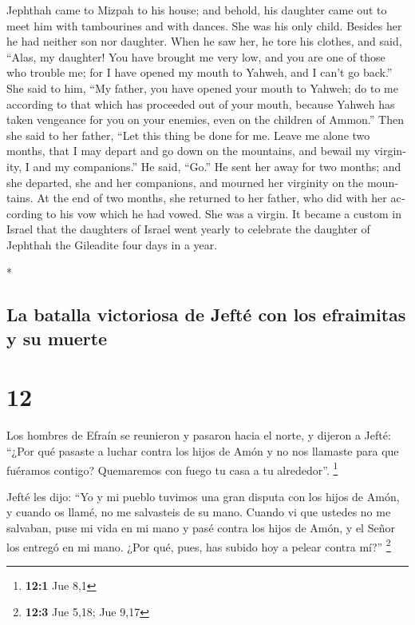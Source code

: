\begin{paracol}{2}
\begin{otherlanguage}{english}
 Jephthah came to Mizpah to his house; and behold, his
daughter came out to meet him with tambourines and with dances. She was
his only child. Besides her he had neither son nor daughter.
 When he saw her, he tore his clothes, and said, ``Alas,
my daughter! You have brought me very low, and you are one of those who
trouble me; for I have opened my mouth to Yahweh, and I can't go back.''
 She said to him, ``My father, you have opened your mouth
to Yahweh; do to me according to that which has proceeded out of your
mouth, because Yahweh has taken vengeance for you on your enemies, even
on the children of Ammon.''  Then she said to her father,
``Let this thing be done for me. Leave me alone two months, that I may
depart and go down on the mountains, and bewail my virginity, I and my
companions.''  He said, ``Go.'' He sent her away for two
months; and she departed, she and her companions, and mourned her
virginity on the mountains.  At the end of two months,
she returned to her father, who did with her according to his vow which
he had vowed. She was a virgin. It became a custom in Israel
 that the daughters of Israel went yearly to celebrate
the daughter of Jephthah the Gileadite four days in a year.

\end{otherlanguage}

\switchcolumn[0]*

\hypertarget{la-batalla-victoriosa-de-jeftuxe9-con-los-efraimitas-y-su-muerte}{%
\subsection{La batalla victoriosa de Jefté con los efraimitas y su
muerte}\label{la-batalla-victoriosa-de-jeftuxe9-con-los-efraimitas-y-su-muerte}}

\hypertarget{section-22}{%
\section{12}\label{section-22}}

 Los hombres de Efraín se reunieron y pasaron hacia el
norte, y dijeron a Jefté: ``¿Por qué pasaste a luchar contra los hijos
de Amón y no nos llamaste para que fuéramos contigo? Quemaremos con
fuego tu casa a tu alrededor''. \footnote{\textbf{12:1} Jue 8,1}

 Jefté les dijo: ``Yo y mi pueblo tuvimos una gran disputa
con los hijos de Amón, y cuando os llamé, no me salvasteis de su mano.
 Cuando vi que ustedes no me salvaban, puse mi vida en mi
mano y pasé contra los hijos de Amón, y el Señor los entregó en mi mano.
¿Por qué, pues, has subido hoy a pelear contra mí?'' \footnote{\textbf{12:3}
  Jue 5,18; Jue 9,17}


\end{paracol}
